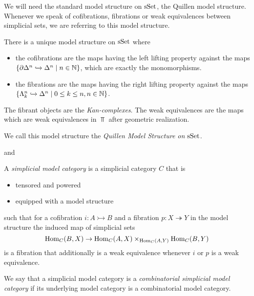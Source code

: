We will need the standard model structure on $\operatorname{sSet}$, the Quillen model structure. 
Whenever we speak of cofibrations, fibrations or weak equivalences between simplicial sets, we are referring to this model structure.
\begin{prop}
    There is a unique model structure on $\operatorname{sSet}$ where 
    \begin{itemize}
        \item the cofibrations are the maps having the left lifting property against the maps $\left\lbrace\partial\Delta^n\xhookrightarrow{}\Delta^n\mid n\in\mathbb{N}\right\rbrace$, which are exactly the monomorphisms.
        \item the fibrations are the maps having the right lifting property against the maps $\left\lbrace\Lambda_k^n\xhookrightarrow{}\Delta^n\mid 0\leq k\leq n, n\in\mathbb{N}\right\rbrace$.
    \end{itemize}
    The fibrant objects are the \emph{Kan-complexes}.
    The weak equivalences are the maps which are weak equivalences in $\Top$ after geometric realization.

    We call this model structure the \emph{Quillen Model Structure on $\operatorname{sSet}$}.
    \begin{reference}
        \cite[Theorem 3.1.8 and Theorem 3.1.29]{cisinski_2019} and \cite[Chap. II, \S 3, Theorem 1]{Quillen1967}
    \end{reference}
\end{prop}
\begin{definition}
    A \emph{simplicial model category} is a simplicial category $C$ that is 
    \begin{itemize}
        \item tensored and powered
        \item equipped with a model structure
    \end{itemize} 
    such that for a cofibration $i:A\rightarrowtail B$ and a fibration $p:X\twoheadrightarrow Y$ in the model structure the induced map of simplicial sets
    \begin{equation*}
        \operatorname{Hom}_C(B,X)\to\operatorname{Hom}_C(A,X)\times_{\operatorname{Hom}_C(A,Y)}\operatorname{Hom}_C(B,Y)
    \end{equation*}
    is a fibration that additionally is a weak equivalence whenever $i$ or $p$ is a weak equivalence.
    
    We say that a simplicial model category is a \emph{combinatorial simplicial model category} if its underlying model category is a combinatorial model category.
\end{definition}
